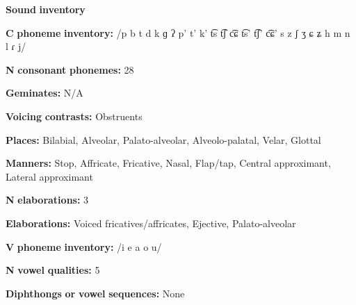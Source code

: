 \begin{styleBody}
\textbf{Sound} \textbf{inventory}
\end{styleBody}

\begin{styleBody}
\textbf{C} \textbf{phoneme} \textbf{inventory:} /p b t d k ɡ ʔ p’ t’ k’ t͡s t͡ʃ c͡ɕ t͡s’ t͡ʃ’ c͡ɕ’ s z ʃ ʒ ɕ ʑ h m n l ɾ j/
\end{styleBody}

\begin{styleBody}
\textbf{N} \textbf{consonant} \textbf{phonemes:} 28
\end{styleBody}

\begin{styleBody}
\textbf{Geminates:} N/A
\end{styleBody}

\begin{styleBody}
\textbf{Voicing} \textbf{contrasts:} Obstruents
\end{styleBody}

\begin{styleBody}
\textbf{Places:} Bilabial, Alveolar, Palato-alveolar, Alveolo-palatal, Velar, Glottal
\end{styleBody}

\begin{styleBody}
\textbf{Manners:} Stop, Affricate, Fricative, Nasal, Flap/tap, Central approximant, Lateral approximant
\end{styleBody}

\begin{styleBody}
\textbf{N} \textbf{elaborations:} 3
\end{styleBody}

\begin{styleBody}
\textbf{Elaborations:} Voiced fricatives/affricates, Ejective, Palato-alveolar
\end{styleBody}

\begin{styleBody}
\textbf{V} \textbf{phoneme} \textbf{inventory:} /i e a o u/
\end{styleBody}

\begin{styleBody}
\textbf{N} \textbf{vowel} \textbf{qualities:} 5
\end{styleBody}

\begin{styleBody}
\textbf{Diphthongs} \textbf{or} \textbf{vowel} \textbf{sequences:} None
\end{styleBody}

